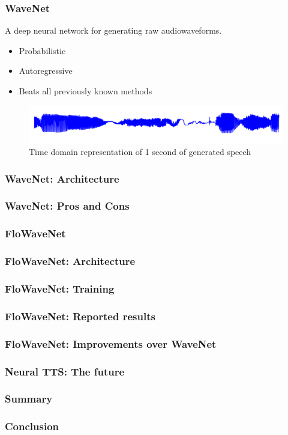 \documentclass{beamer}
\begin{document}
  \begin{frame}
    \frametitle{WaveNet}
      A deep neural network for generating raw audiowaveforms.

      \begin{itemize}
        \item Probabilistic 
        \item Autoregressive
        \item Beats all previously known methods
      \end{itemize}
      \begin{figure}
        \centering
        \includegraphics[width=\textwidth]{images/second_of_speech.png}
        \caption{Time domain representation of 1 second of generated speech}
      \end{figure}
  \end{frame}

  \begin{frame}
    \frametitle{WaveNet: Architecture}
  \end{frame}

  \begin{frame}
    \frametitle{WaveNet: Pros and Cons}
  \end{frame}

  \begin{frame}
    \frametitle{FloWaveNet}

  \end{frame}

  \begin{frame}
    \frametitle{FloWaveNet: Architecture}
  \end{frame}

  \begin{frame}
    \frametitle{FloWaveNet: Training}
  \end{frame}

  \begin{frame}
    \frametitle{FloWaveNet: Reported results}
  \end{frame}

  \begin{frame}
    \frametitle{FloWaveNet: Improvements over WaveNet}
  \end{frame}

  \begin{frame}
    \frametitle{Neural TTS: The future}
  \end{frame}

  \begin{frame}
    \frametitle{Summary}
  \end{frame}

  \begin{frame}
    \frametitle{Conclusion}
  \end{frame}
  
\end{document}
